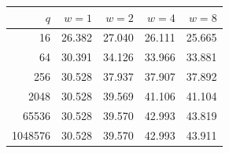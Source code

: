\begin{tabular}{rrrrr}
\toprule
$q$ & $w=1$ & $w=2$ & $w=4$ & $w=8$\\
\midrule
16 & 26.382 & 27.040 & 26.111 & 25.665 \\
64 & 30.391 & 34.126 & 33.966 & 33.881 \\
256 & 30.528 & 37.937 & 37.907 & 37.892 \\
2048 & 30.528 & 39.569 & 41.106 & 41.104 \\
65536 & 30.528 & 39.570 & 42.993 & 43.819 \\
1048576 & 30.528 & 39.570 & 42.993 & 43.911 \\
\bottomrule
\end{tabular}
